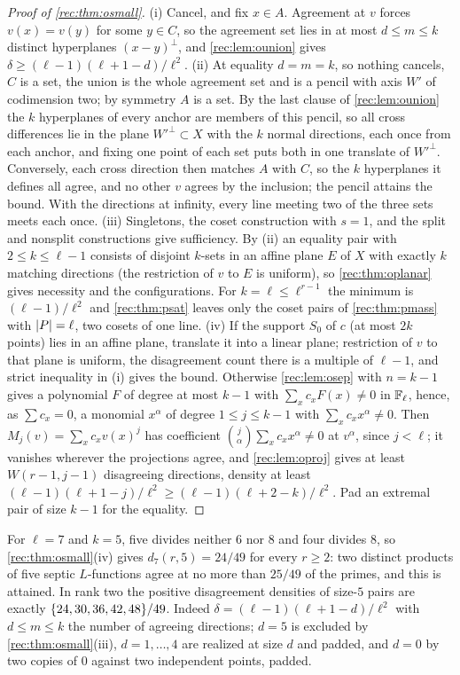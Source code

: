 \begin{proof}[Proof of \cref{rec:thm:osmall}]
(i) Cancel, and fix $x\in A$. Agreement at $v$ forces $v(x)=v(y)$ for some $y\in C$, so the agreement set lies in
at most $d\le m\le k$ distinct hyperplanes $(x-y)^\perp$, and \cref{rec:lem:ounion} gives $\delta\ge(\ell-1)(\ell+1-d)/\ell^2$.
(ii) At equality $d=m=k$, so nothing cancels, $C$ is a set, the union is the whole agreement set and is a
pencil with axis $W'$ of codimension two; by symmetry $A$ is a set. By the last clause of
\cref{rec:lem:ounion} the $k$ hyperplanes of every anchor are members of this pencil, so all cross differences
lie in the plane $W'^\perp\subset X$ with the $k$ normal directions, each once from each anchor, and fixing one point of
each set puts both in one translate of $W'^\perp$. Conversely, each cross direction then matches $A$ with $C$, so
the $k$ hyperplanes it defines all agree, and no other $v$ agrees by the inclusion; the pencil attains the
bound. With the directions at infinity, every line meeting two of the three sets meets each once.
(iii) Singletons, the coset construction with $s=1$, and the split and nonsplit constructions give
sufficiency. By (ii) an equality pair with $2\le k\le\ell-1$ consists of disjoint $k$-sets in an affine plane $E$ of $X$
with exactly $k$ matching directions (the restriction of $v$ to $E$ is uniform), so \cref{rec:thm:oplanar} gives
necessity and the configurations. For $k=\ell\le\ell^{r-1}$ the minimum is $(\ell-1)/\ell^2$ and \cref{rec:thm:psat} leaves only the
coset pairs of \cref{rec:thm:pmass} with $\lvert P\rvert=\ell$, two cosets of one line.
(iv) If the support $S_0$ of $c$ (at most $2k$ points) lies in an affine plane, translate it into a linear plane;
restriction of $v$ to that plane is uniform, the disagreement count there is a multiple of $\ell-1$, and strict
inequality in (i) gives the bound. Otherwise \cref{rec:lem:osep} with $n=k-1$ gives a polynomial $F$ of degree at
most $k-1$ with $\sum_xc_xF(x)\ne0$ in $\mathbb{F}_\ell$, hence, as $\sum c_x=0$, a monomial $x^\alpha$ of degree $1\le j\le k-1$ with
$\sum_xc_xx^\alpha\ne0$. Then $M_j(v)=\sum_xc_xv(x)^j$ has coefficient $\binom j\alpha\sum_xc_xx^\alpha\ne0$ at $v^\alpha$, since $j<\ell$; it
vanishes wherever the projections agree, and \cref{rec:lem:oproj} gives at least $W(r-1,j-1)$ disagreeing
directions, density at least $(\ell-1)(\ell+1-j)/\ell^2\ge(\ell-1)(\ell+2-k)/\ell^2$. Pad an extremal pair of size $k-1$ for the
equality.
\end{proof}

\begin{example}\label{rec:cor:oseven}
For $\ell=7$ and $k=5$, five divides neither $6$ nor $8$ and four divides $8$, so \cref{rec:thm:osmall}(iv) gives $d_7(r,5)=24/49$ for every
$r\ge2$: two distinct products of five septic $L$-functions agree at no more than $25/49$ of the primes, and
this is attained. In rank two the positive disagreement densities of size-$5$ pairs are exactly
$\{24,30,36,42,48\}/49$. Indeed $\delta=(\ell-1)(\ell+1-d)/\ell^2$ with $d\le m\le k$ the number of agreeing directions;
$d=5$ is excluded by \cref{rec:thm:osmall}(iii), $d=1,\dots,4$ are realized at size $d$ and padded, and $d=0$ by two copies of $0$
against two independent points, padded.
\end{example}

